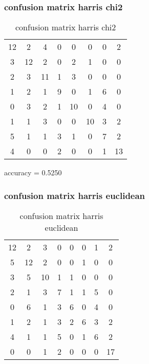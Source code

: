 \documentclass[12pt]{article}
\begin{document}
\subsubsection{confusion matrix harris chi2}
\begin{table}[H]
\centering
\begin{tabular}{c c c c c c c c}
    12 &     2 &     4 &     0 &     0 &     0 &     0 &     2 \\
     3 &    12 &     2 &     0 &     2 &     1 &     0 &     0 \\
     2 &     3 &    11 &     1 &     3 &     0 &     0 &     0 \\
     1 &     2 &     1 &     9 &     0 &     1 &     6 &     0 \\
     0 &     3 &     2 &     1 &    10 &     0 &     4 &     0 \\
     1 &     1 &     3 &     0 &     0 &    10 &     3 &     2 \\
     5 &     1 &     1 &     3 &     1 &     0 &     7 &     2 \\
     4 &     0 &     0 &     2 &     0 &     0 &     1 &    13 
\end{tabular}
\caption{confusion matrix harris chi2}
\label{table:harrischi2}
\end{table}


accuracy = 0.5250


\subsubsection{confusion matrix harris euclidean}
\begin{table}[H]
\centering
\begin{tabular}{c c c c c c c c}
    12 &     2 &     3 &     0 &     0 &     0 &     1 &     2 \\
     5 &    12 &     2 &     0 &     0 &     1 &     0 &     0 \\
     3 &     5 &    10 &     1 &     1 &     0 &     0 &     0 \\
     2 &     1 &     3 &     7 &     1 &     1 &     5 &     0 \\
     0 &     6 &     1 &     3 &     6 &     0 &     4 &     0 \\
     1 &     2 &     1 &     3 &     2 &     6 &     3 &     2 \\
     4 &     1 &     1 &     5 &     0 &     1 &     6 &     2 \\
     0 &     0 &     1 &     2 &     0 &     0 &     0 &    17 
\end{tabular}
\caption{confusion matrix harris euclidean}
\label{table:harriseuc}
\end{table}
\end{document}
